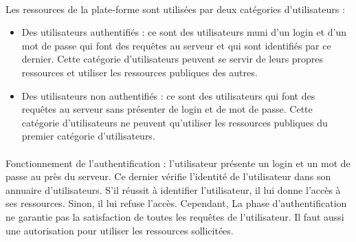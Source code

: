 \documentclass{report}
\begin{document}
\paragraph{}
Les ressources de la plate-forme sont utilisées par deux catégories d'utilisateurs : 

\begin{itemize}
\item Des utilisateurs authentifiés : ce sont des utilisateurs muni d'un login et d'un mot de passe qui font des requêtes au 
serveur et qui sont identifiés par ce dernier. Cette catégorie d'utilisateurs peuvent se servir de leurs propres ressources et
utiliser les ressources publiques des autres.
\item Des utilisateurs non authentifiés : ce sont des utilisateurs qui font des requêtes au serveur sans présenter de login 
et de mot de passe. Cette catégorie d'utilisateurs ne peuvent qu'utiliser les ressources publiques du premier catégorie 
d'utilisateurs.
\end{itemize}

\paragraph{}
Fonctionnement de l'authentification : l'utilisateur présente un login et un mot de passe au près du serveur. Ce dernier vérifie l'identité de l'utilisateur dans son annuaire d'utilisateurs. S'il réussit à identifier l'utilisateur, il lui donne l'accès à 
ses ressources. Sinon, il lui refuse l'accès. Cependant, La phase d'authentification ne garantie pas la satisfaction de toutes 
les requêtes de l'utilisateur. Il faut aussi une autorisation pour utiliser les ressources sollicitées.
\end{document}
